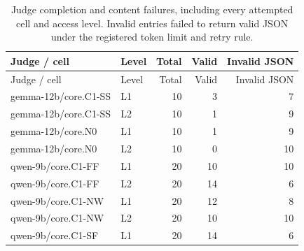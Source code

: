 \begingroup\footnotesize\setlength{\tabcolsep}{3pt}
\begin{longtable}{@{}llrrr@{}}
\caption{Judge completion and content failures, including every attempted cell and access level. Invalid entries failed to return valid JSON under the registered token limit and retry rule.}\\
\toprule Judge / cell & Level & Total & Valid & Invalid JSON\\\midrule\endfirsthead
\toprule Judge / cell & Level & Total & Valid & Invalid JSON\\\midrule\endhead
\bottomrule\endfoot
gemma-12b/\allowbreak core.\allowbreak C1-SS & L1 & 10 & 3 & 7\\
gemma-12b/\allowbreak core.\allowbreak C1-SS & L2 & 10 & 1 & 9\\
gemma-12b/\allowbreak core.\allowbreak N0 & L1 & 10 & 1 & 9\\
gemma-12b/\allowbreak core.\allowbreak N0 & L2 & 10 & 0 & 10\\
qwen-9b/\allowbreak core.\allowbreak C1-FF & L1 & 20 & 10 & 10\\
qwen-9b/\allowbreak core.\allowbreak C1-FF & L2 & 20 & 14 & 6\\
qwen-9b/\allowbreak core.\allowbreak C1-NW & L1 & 20 & 12 & 8\\
qwen-9b/\allowbreak core.\allowbreak C1-NW & L2 & 20 & 10 & 10\\
qwen-9b/\allowbreak core.\allowbreak C1-SF & L1 & 20 & 14 & 6\\

\end{longtable}

